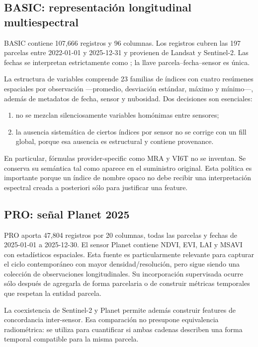 \subsection{BASIC: representación longitudinal multiespectral}

BASIC contiene 107,666 registros y 96 columnas. Los registros cubren las 197 parcelas entre
2022-01-01 y 2025-12-31 y provienen de Landsat y Sentinel-2. Las fechas se interpretan
estrictamente como ; la llave parcela--fecha--sensor es única.

La estructura de variables comprende 23 familias de índices con cuatro resúmenes espaciales
por observación ---promedio, desviación estándar, máximo y mínimo---, además de metadatos de
fecha, sensor y nubosidad. Dos decisiones son esenciales:
\begin{enumerate}
\item no se mezclan silenciosamente variables homónimas entre sensores;
\item la ausencia sistemática de ciertos índices por sensor no se corrige con un fill global,
porque esa ausencia es estructural y contiene provenance.
\end{enumerate}

En particular, fórmulas provider-specific como MRA y VI6T no se inventan. Se conserva su
semántica tal como aparece en el suministro original. Esta política es importante porque un
índice de nombre opaco no debe recibir una interpretación espectral creada a posteriori sólo
para justificar una feature.

\subsection{PRO: señal Planet 2025}

PRO aporta 47,804 registros por 20 columnas, todas las parcelas y fechas de 2025-01-01 a
2025-12-30. El sensor Planet contiene NDVI, EVI, LAI y MSAVI con estadísticos espaciales.
Esta fuente es particularmente relevante para capturar el ciclo contemporáneo con mayor
densidad/resolución, pero sigue siendo una colección de observaciones longitudinales. Su
incorporación supervisada ocurre sólo después de agregarla de forma parcelaria o de construir
métricas temporales que respetan la entidad parcela.

La coexistencia de Sentinel-2 y Planet permite además construir features de concordancia
inter-sensor. Esa comparación no presupone equivalencia radiométrica: se utiliza para
cuantificar si ambas cadenas describen una forma temporal compatible para la misma parcela.

